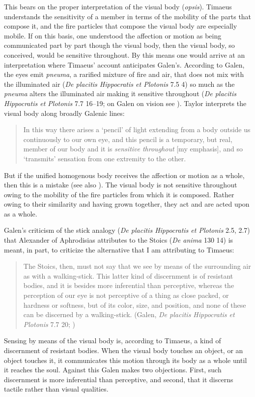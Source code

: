 This bears on the proper interpretation of the visual body (\emph{opsis}). Timaeus understands the sensitivity of a member in terms of the mobility of the parts that compose it, and the fire particles that compose the visual body are especially mobile. If on this basis, one understood the affection or motion as being communicated part by part though the visual body, then the visual body, so conceived, would be sensitive throughout. By this means one would arrive at an interpretation where Timaeus' account anticipates Galen's. According to Galen, the eyes emit \emph{pneuma}, a rarified mixture of fire and air, that does not mix with the illuminated air (\emph{De placitis Hippocratis et Plotonis} 7.5 4) so much as the \emph{pneuma} alters the illuminated air making it sensitive throughout (\emph{De placitis Hippocratis et Plotonis} 7.7 16--19; on Galen on vision see \citealt{Ierodiakonou:2014rj}). Taylor interprets the visual body along broadly Galenic lines:
\begin{quote}
	In this way there arises a `pencil' of light extending from a body outside us continuously to our own eye, and this pencil is a temporary, but real, member of our body and it is \emph{sensitive throughout} [my emphasis], and so `transmits' sensation from one extremity to the other. \citep[278]{Taylor:1928qb}
\end{quote}
But if the unified homogenous body receives the affection or motion as a whole, then this is a mistake (see also \citealt[153 n1]{Cornford:1935fk}). The visual body is not sensitive throughout owing to the mobility of the fire particles from which it is composed. Rather owing to their similarity and having grown together, they act and are acted upon as a whole.

Galen's criticism of the stick analogy (\emph{De placitis Hippocratis et Plotonis} 2.5, 2.7) that Alexander of Aphrodisias attributes to the Stoics (\emph{De anima} 130 14) is meant, in part, to criticize the alternative that I am attributing to Timaeus:
\begin{quote}
	The Stoics, then, must not say that we see by means of the surrounding air as with a walking-stick. This latter kind of discernment is of resistant bodies, and it is besides more inferential than perceptive, whereas the perception of our eye is not perceptive of a thing as close packed, or hardness or softness, but of its color, size, and position, and none of these can be discerned by a walking-stick. (Galen, \emph{De placitis Hippocratis et Plotonis} 7.7 20; \citealt[475]{Lacy:1980mk})
\end{quote}
Sensing by means of the visual body is, according to Timaeus, a kind of discernment of resistant bodies. When the visual body touches an object, or an object touches it, it communicates this motion through its body as a whole until it reaches the soul. Against this Galen makes two objections. First, such discernment is more inferential than perceptive, and second, that it discerns tactile rather than visual qualities. 


